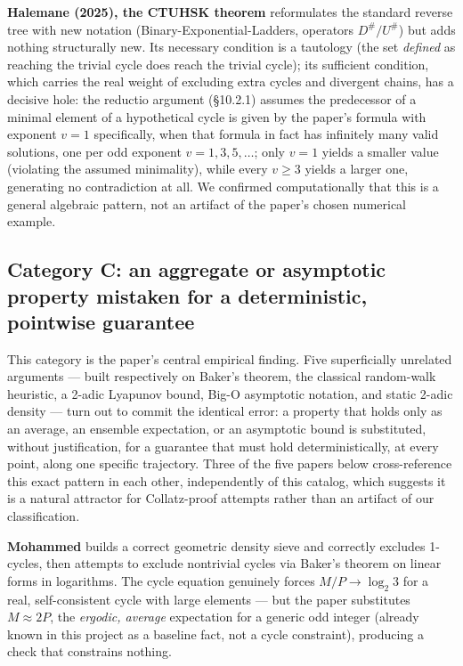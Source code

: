 \documentclass[11pt]{article}
\begin{document}
\textbf{Halemane (2025), the CTUHSK theorem} \cite{Halemane2025}
reformulates the standard reverse tree with new notation
(Binary-Exponential-Ladders, operators \(D^\#/U^\#\)) but adds nothing
structurally new. Its necessary condition is a tautology (the set
\emph{defined} as reaching the trivial cycle does reach the trivial
cycle); its sufficient condition, which carries the real weight of
excluding extra cycles and divergent chains, has a decisive hole: the
reductio argument (\S10.2.1) assumes the predecessor of a minimal
element of a hypothetical cycle is given by the paper's formula with
exponent \(v=1\) specifically, when that formula in fact has infinitely
many valid solutions, one per odd exponent \(v=1,3,5,\dots\); only
\(v=1\) yields a smaller value (violating the assumed minimality),
while every \(v\ge 3\) yields a larger one, generating no contradiction
at all. We confirmed computationally that this is a general algebraic
pattern, not an artifact of the paper's chosen numerical example.

\subsection{Category C: an aggregate or asymptotic property mistaken for a deterministic, pointwise guarantee}
\label{sec:catC}

This category is the paper's central empirical finding. Five
superficially unrelated arguments --- built respectively on Baker's
theorem, the classical random-walk heuristic, a 2-adic Lyapunov bound,
Big-O asymptotic notation, and static 2-adic density --- turn out to
commit the identical error: a property that holds only as an average,
an ensemble expectation, or an asymptotic bound is substituted, without
justification, for a guarantee that must hold deterministically, at
every point, along one specific trajectory. Three of the five papers
below cross-reference this exact pattern in each other, independently
of this catalog, which suggests it is a natural attractor for
Collatz-proof attempts rather than an artifact of our classification.

\textbf{Mohammed} \cite{Mohammed2024} builds a correct geometric density
sieve and correctly excludes 1-cycles, then attempts to exclude
nontrivial cycles via Baker's theorem on linear forms in logarithms.
The cycle equation genuinely forces \(M/P \to \log_2 3\) for a real,
self-consistent cycle with large elements --- but the paper substitutes
\(M \approx 2P\), the \emph{ergodic, average} expectation for a generic
odd integer (already known in this project as a baseline fact, not a
cycle constraint), producing a check that constrains nothing.
\end{document}
